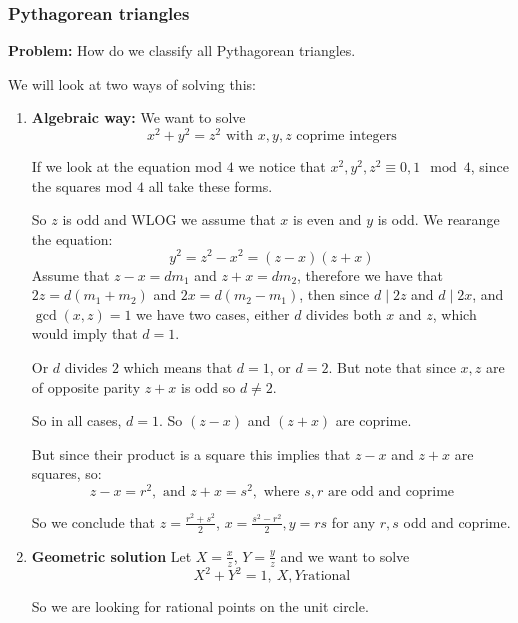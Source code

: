 \subsubsection{Pythagorean triangles}
\textbf{Problem:} How do we classify all Pythagorean triangles.

We will look at two ways of solving this:\begin{enumerate}
    \item \textbf{Algebraic way:} 
    We want to solve\begin{equation}
        x^2+y^2 = z^2 \text{ with }x,y,z\text{ coprime integers}
    \end{equation}
    
    If we look at the equation mod $4$ we notice that $x^2,y^2,z^2 \equiv 0,1 \mod 4$, since the squares mod $4$ all take these forms.
    
    So $z$ is odd and WLOG we assume that $x$ is even and $y$ is odd. 
    We rearange the equation:\begin{equation}
        y^2 = z^2-x^2 = (z-x)(z+x)
    \end{equation}
    Assume that $z-x = dm_1$ and $z+x = dm_2$, therefore we have that $2z = d(m_1+m_2)$ and $2x = d(m_2-m_1)$, then since $d\mid 2z$ and $d\mid 2x$, and $\gcd(x,z) = 1$ we have two cases, either $d$ divides both $x$ and $z$, which would imply that $d=1$.
    
    Or $d$ divides $2$ which means that $d = 1$, or $d=2$. But note that since $x,z$ are of opposite parity $z+x$ is odd so $d\neq 2$.
    
    So in all cases, $d = 1$. So $(z-x)$ and $(z+x)$ are coprime.
    
    But since their product is a square this implies that $z-x$ and $z+x$ are squares, so:\begin{equation}
        z-x = r^2, \text{ and }z+x = s^2, \text{ where }s,r\text{ are odd and coprime}
    \end{equation}
    
    So we conclude that $z = \frac{r^2+s^2}{2}$, $x = \frac{s^2-r^2}{2}, y=rs $ for any $r,s$ odd and coprime.
    
    \item \textbf{Geometric solution}
    Let $X = \frac{x}{z}$, $Y = \frac{y}{z}$ and we want to solve\begin{equation}
        X^2+Y^2=1, \ X,Y\text{rational}
    \end{equation}
    
    So we are looking for rational points on the unit circle.
    

\end{enumerate}

